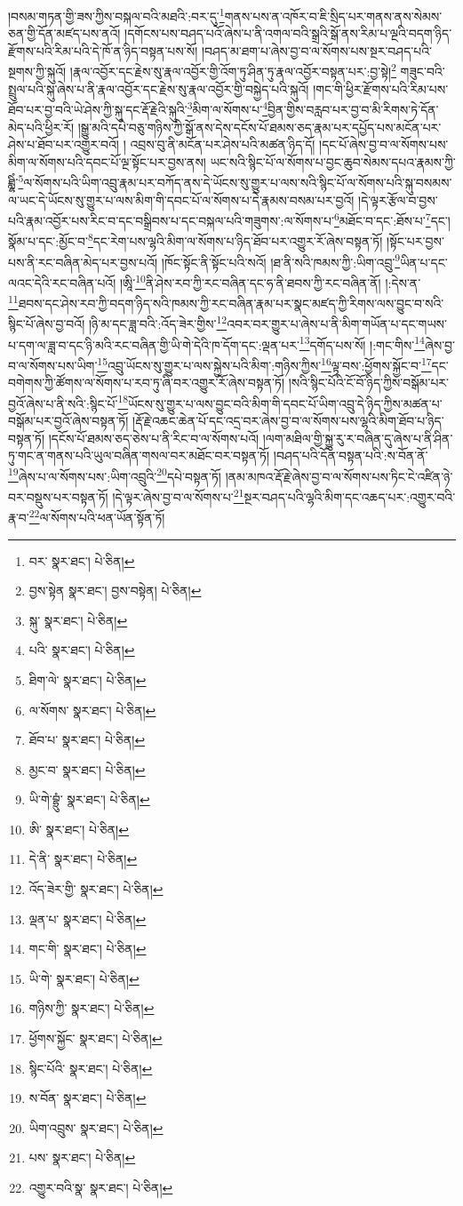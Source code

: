 །བསམ་གཏན་གྱི་ཟས་ཀྱིས་བསྐལ་བའི་མཐའི་:བར་དུ་\footnote{བར་  སྣར་ཐང་།  པེ་ཅིན། }གནས་པས་ན་འཁོར་བ་ཇི་སྲིད་པར་གནས་ནས་སེམས་ཅན་གྱི་དོན་མཛད་པས་ནའོ། །དགོངས་པས་བཤད་པའོ་ཞེས་པ་ནི་འགལ་བའི་སྒྲའི་སྒོ་ནས་རིམ་པ་ལྔའི་བདག་ཉིད་རྫོགས་པའི་རིམ་པའི་དེ་ཁོ་ན་ཉིད་བསྟན་པས་སོ། །བཤད་མ་ཐག་པ་ཞེས་བྱ་བ་ལ་སོགས་པས་སྔར་བཤད་པའི་སྔགས་ཀྱི་སྐུའོ། །རྣལ་འབྱོར་དང་རྗེས་སུ་རྣལ་འབྱོར་གྱི་འོག་ཏུ་ཤིན་ཏུ་རྣལ་འབྱོར་བསྟན་པར་:བྱ་སྟེ།\footnote{བྱས་སྟེན  སྣར་ཐང་། བྱས་བསྟེན།  པེ་ཅིན། } གཟུང་བའི་སྤྲུལ་པའི་སྐུ་ཞེས་པ་ནི་རྣལ་འབྱོར་དང་རྗེས་སུ་རྣལ་འབྱོར་གྱི་བསྐྱེད་པའི་སྐུའོ། །གང་གི་ཕྱིར་རྫོགས་པའི་རིམ་པས་ཐོབ་པར་བྱ་བའི་ཡེ་ཤེས་ཀྱི་སྐུ་དང་རྡོ་རྗེའི་སྐུའི་\footnote{སྐུ་  སྣར་ཐང་།  པེ་ཅིན། }མིག་ལ་སོགས་པ་\footnote{པའི་  སྣར་ཐང་།  པེ་ཅིན། }བྱིན་གྱིས་བརླབ་པར་བྱ་བ་མི་རིགས་ཏེ་དོན་མེད་པའི་ཕྱིར་རོ། །སྒྱུ་མའི་དཔེ་བཅུ་གཉིས་ཀྱི་སྒོ་ནས་དེས་དངོས་པོ་ཐམས་ཅད་རྣམ་པར་དཔྱོད་པས་མངོན་པར་ཤེས་པ་ཐོབ་པར་འགྱུར་བའོ། །
འབྲས་བུ་ནི་མངོན་པར་ཤེས་པའི་མཚན་ཉིད་དོ། །དང་པོ་ཞེས་བྱ་བ་ལ་སོགས་པས་མིག་ལ་སོགས་པའི་དབང་པོ་ལྔ་སྟོང་པར་བྱས་ནས། ཡང་སའི་སྙིང་པོ་ལ་སོགས་པ་བྱང་ཆུབ་སེམས་དཔའ་རྣམས་ཀྱི་ཐླྷིཾ་\footnote{ཐིག་ལེ་  སྣར་ཐང་།  པེ་ཅིན། }ལ་སོགས་པའི་ཡིག་འབྲུ་རྣམ་པར་བཀོད་ནས་དེ་ཡོངས་སུ་གྱུར་པ་ལས་སའི་སྙིང་པོ་ལ་སོགས་པའི་སྐུ་བསམས་ལ་ཡང་དེ་ཡོངས་སུ་གྱུར་པ་ལས་མིག་གི་དབང་པོ་ལ་སོགས་པ་དེ་རྣམས་བསམ་པར་བྱའོ། །དེ་ལྟར་རྩོལ་བ་བྱས་པའི་རྣམ་འབྱོར་པས་རིང་བ་དང་བསྒྲིབས་པ་དང་བསྐལ་པའི་གཟུགས་:ལ་སོགས་པ་\footnote{ལ་སོགས་  སྣར་ཐང་།  པེ་ཅིན། }མཐོང་བ་དང་:ཐོས་པ་\footnote{ཐོབ་པ་  སྣར་ཐང་།  པེ་ཅིན། }དང་། སྣོམ་པ་དང་:མྱོང་བ་\footnote{མྱང་བ་  སྣར་ཐང་།  པེ་ཅིན། }དང་རེག་པས་ལྷའི་མིག་ལ་སོགས་པ་ཉིད་ཐོབ་པར་འགྱུར་རོ་ཞེས་བསྟན་ཏོ། །སྟོང་པར་བྱས་པས་ནི་རང་བཞིན་མེད་པར་བྱས་པའོ། །ཁོང་སྟོང་ནི་སྟོང་པའི་སའོ། །ཐ་ནི་སའི་ཁམས་ཀྱི་:ཡིག་འབྲུ་\footnote{ཡི་གེ་བྷྲུཾ་  སྣར་ཐང་།  པེ་ཅིན། }ཡིན་པ་དང་ལའང་དེའི་རང་བཞིན་པའོ། །ཨཱི་\footnote{ཨི་  སྣར་ཐང་།  པེ་ཅིན། }ནི་ཤེས་རབ་ཀྱི་རང་བཞིན་དང་ཧ་ནི་ཐབས་ཀྱི་རང་བཞིན་ནོ། །:དེས་ན་\footnote{དེ་ནི་  སྣར་ཐང་།  པེ་ཅིན། }ཐབས་དང་ཤེས་རབ་ཀྱི་བདག་ཉིད་སའི་ཁམས་ཀྱི་རང་བཞིན་རྣམ་པར་སྣང་མཛད་ཀྱི་རིགས་ལས་བྱུང་བ་སའི་སྙིང་པོ་ཞེས་བྱ་བའོ། །ཉི་མ་དང་ཟླ་བའི་:འོད་ཟེར་གྱིས་\footnote{འོད་ཟེར་གྱི་  སྣར་ཐང་།  པེ་ཅིན། }འབར་བར་གྱུར་པ་ཞེས་པ་ནི་མིག་གཡོན་པ་དང་གཡས་པ་དག་ལ་ཟླ་བ་དང་ཉི་མའི་རང་བཞིན་གྱི་ཡི་གེ་དེའི་ཁ་དོག་དང་:ལྡན་པར་\footnote{ལྡན་པ་  སྣར་ཐང་།  པེ་ཅིན། }དགོད་པས་སོ། །:གང་གིས་\footnote{གང་གི་  སྣར་ཐང་།  པེ་ཅིན། }ཞེས་བྱ་བ་ལ་སོགས་པས་ཡིག་\footnote{ཡི་གེ་  སྣར་ཐང་།  པེ་ཅིན། }འབྲུ་ཡོངས་སུ་གྱུར་པ་ལས་སྐྱེས་པའི་མིག་:གཉིས་ཀྱིས་\footnote{གཉིས་ཀྱི་  སྣར་ཐང་།  པེ་ཅིན། }ལྟ་བས་:ཕྱོགས་སྐྱོང་བ་\footnote{ཕྱོགས་སྐྱོང་  སྣར་ཐང་།  པེ་ཅིན། }དང་བགེགས་ཀྱི་ཚོགས་ལ་སོགས་པ་རབ་ཏུ་ཞི་བར་འགྱུར་རོ་ཞེས་བསྟན་ཏོ། །སའི་སྙིང་པོའི་ངོ་བོ་ཉིད་ཀྱིས་བསྒོམ་པར་བྱའོ་ཞེས་པ་ནི་སའི་:སྙིང་པོ་\footnote{སྙིང་པོའི་  སྣར་ཐང་།  པེ་ཅིན། }ཡོངས་སུ་གྱུར་པ་ལས་བྱུང་བའི་མིག་གི་དབང་པོ་ཡིག་འབྲུ་དེ་ཉིད་ཀྱིས་མཚན་པ་བསྒོམ་པར་བྱའོ་ཞེས་བསྟན་ཏོ། །རྡོ་རྗེ་འཆང་ཆེན་པོ་དང་འདྲ་བར་ཞེས་བྱ་བ་ལ་སོགས་པས་ལྷའི་མིག་ཐོབ་པ་ཉིད་བསྟན་ཏོ། །དངོས་པོ་ཐམས་ཅད་ཅེས་པ་ནི་རིང་བ་ལ་སོགས་པའོ། །ལག་མཐིལ་གྱི་སྐྱུ་རུ་ར་བཞིན་དུ་ཞེས་པ་ནི་ཤིན་ཏུ་གང་ན་གནས་པའི་ཡུལ་བཞིན་གསལ་བར་མཐོང་བར་བསྟན་ཏོ། །བཤད་པའི་དོན་བསྟན་པའི་:ས་བོན་ནོ་\footnote{ས་བོན་  སྣར་ཐང་།  པེ་ཅིན། }ཞེས་པ་ལ་སོགས་པས་:ཡིག་འབྲུའི་\footnote{ཡིག་འབྲུས་  སྣར་ཐང་།  པེ་ཅིན། }དཔེ་བསྟན་ཏོ། །ནམ་མཁའ་རྡོ་རྗེ་ཞེས་བྱ་བ་ལ་སོགས་པས་ཏིང་ངེ་འཛིན་ཉེ་བར་བསྡུས་པར་བསྟན་ཏོ། །དེ་ལྟར་ཞེས་བྱ་བ་ལ་སོགས་པ་\footnote{པས་  སྣར་ཐང་།  པེ་ཅིན། }སྔར་བཤད་པའི་ལྷའི་མིག་དང་འཆད་པར་:འགྱུར་བའི་རྣ་བ་\footnote{འགྱུར་བའི་སྣ་  སྣར་ཐང་།  པེ་ཅིན། }ལ་སོགས་པའི་ཕན་ཡོན་སྟོན་ཏོ། 